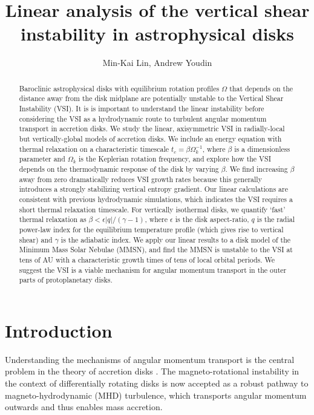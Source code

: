 \documentclass[iop]{emulateapj}
\begin{document}
\title{Linear analysis of the vertical shear instability in astrophysical disks}

\author{Min-Kai Lin, Andrew Youdin}

\begin{abstract}
  Baroclinic astrophysical disks with equilibrium rotation profiles
  $\Omega$ that depends on the distance away from the disk midplane are
  potentially unstable to the Vertical Shear Instability (VSI). It is
  is important to understand the linear instability before
  considering the VSI as a hydrodynamic route to turbulent angular
  momentum transport in accretion disks. We study the linear,
  axisymmetric VSI in radially-local but vertically-global models
  of accretion disks. We include an energy equation with thermal
  relaxation on a characteristic timescale $t_c=\beta\Omega_k^{-1}$,
  where $\beta$ is a dimensionless parameter and $\Omega_k$ is the
  Keplerian rotation frequency, and explore how the VSI depends on the
  thermodynamic response  of the disk by varying $\beta$. We find
  increasing $\beta$ away from zero dramatically reduces VSI growth
  rates because this generally introduces a strongly stabilizing
  vertical entropy gradient. Our linear calculations are consistent
  with previous hydrodynamic simulations, which indicates the VSI 
  requires a short thermal relaxation timescale. For vertically  
  isothermal disks, we quantify `fast'
  thermal relaxation as $\beta < \epsilon|q|/(\gamma-1)$, where
  $\epsilon$ is the disk aspect-ratio, $q$ is the radial power-law
  index for the equilibrium temperature profile (which gives rise to vertical 
  shear) and $\gamma$ is the adiabatic index. We apply our linear
  results to a disk model of the Minimum Mass Solar Nebulae (MMSN), and
  find the MMSN is unstable to the VSI at tens of AU with a
  characteristic growth times of tens of local orbital periods. We 
  suggest the VSI is a viable mechanism for angular momentum
  transport in the outer parts of protoplanetary disks. 
\end{abstract}

\section{Introduction}
Understanding the mechanisms of angular momentum transport is the
central problem in the theory of accretion disks 
\citep{lyndenbell74}. The   
magneto-rotational instability in the context of differentially
rotating disks \citep[MRI,][]{balbus91} is now accepted as a robust
pathway to magneto-hydrodynamic (MHD) turbulence, which transports
angular momentum outwards and thus enables mass accretion. 
\end{document}
